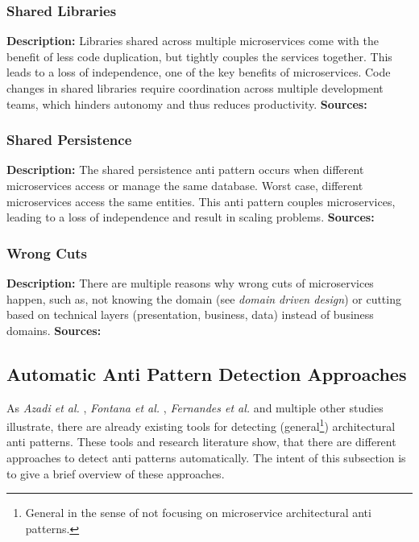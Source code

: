 \documentclass{article}
\begin{document}
\subsubsection{Shared Libraries}
\noindent\textbf{Description:} Libraries shared across multiple microservices come with the benefit of less code duplication, but tightly couples the services together. This leads to a loss of independence, one of the key benefits of microservices. Code changes in shared libraries require coordination across multiple development teams, which hinders autonomy and thus reduces productivity. \newline
\noindent\textbf{Sources:} \cite{
    taibi_definition_2018,
    taibi_microservices_2020}
    
\subsubsection{Shared Persistence}
\noindent\textbf{Description:} The shared persistence anti pattern occurs when different microservices access or manage the same database. Worst case, different microservices access the same entities. This anti pattern couples microservices, leading to a loss of independence and result in scaling problems. \newline
\noindent\textbf{Sources:} \cite{
    taibi_definition_2018,
    taibi_microservices_2020,
    neri_design_2019,
    bogner_towards_2019}
    
\subsubsection{Wrong Cuts}
\noindent\textbf{Description:} There are multiple reasons why wrong cuts of microservices happen, such as, not knowing the domain (see \textit{domain driven design}) or cutting based on technical layers (presentation, business, data) instead of business domains.\newline
\noindent\textbf{Sources:} \cite{
    taibi_definition_2018,
    taibi_microservices_2020,
    bogner_towards_2019}

\subsection{Automatic Anti Pattern Detection Approaches}
As \textit{Azadi et al.} \cite{azadi_architectural_2019}, \textit {Fontana et al.} \cite{fontana_automatic_2012}, \textit{Fernandes et al.} \cite{fernandes_review-based_2016} and multiple other studies illustrate, there are already existing tools for detecting (general\footnote{General in the sense of not focusing on microservice architectural anti patterns.}) architectural anti patterns. These tools and research literature show, that there are different approaches to detect anti patterns automatically. The intent of this subsection is to give a brief overview of these approaches. \newline
\end{document}
